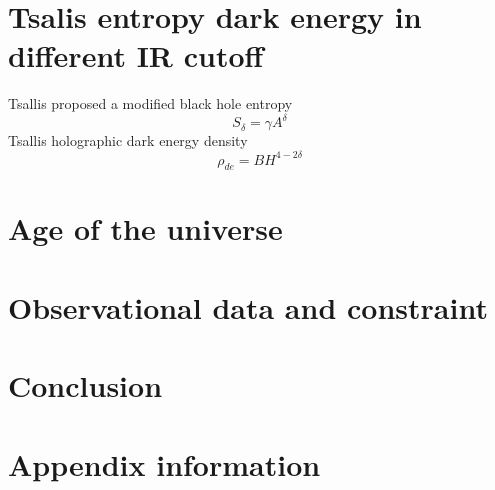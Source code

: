 \documentclass{ws-mpla}
\begin{document}
\section{Tsalis entropy dark energy in different IR cutoff}
Tsallis proposed a modified black hole entropy
\begin{equation}
    S_{\delta}=\gamma A^{\delta}
\end{equation}
Tsallis holographic dark energy density
\begin{equation}
    \rho_{de}=BH^{4-2\delta}
\end{equation}

\section{Age of the universe}

\section{Observational data and constraint }

\section{Conclusion}
\appendix

\section{Appendix information}
\end{document}
